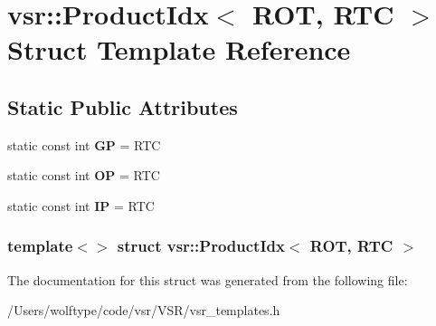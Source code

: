 \hypertarget{structvsr_1_1_product_idx_3_01_r_o_t_00_01_r_t_c_01_4}{\section{vsr\-:\-:Product\-Idx$<$ R\-O\-T, R\-T\-C $>$ Struct Template Reference}
\label{structvsr_1_1_product_idx_3_01_r_o_t_00_01_r_t_c_01_4}
}
\subsection*{Static Public Attributes}
\begin{DoxyCompactItemize}
\item 
\hypertarget{structvsr_1_1_product_idx_3_01_r_o_t_00_01_r_t_c_01_4_abd3369e5400a430e350dcb5d5043fdba}{static const int {\bfseries G\-P} = R\-T\-C}\label{structvsr_1_1_product_idx_3_01_r_o_t_00_01_r_t_c_01_4_abd3369e5400a430e350dcb5d5043fdba}

\item 
\hypertarget{structvsr_1_1_product_idx_3_01_r_o_t_00_01_r_t_c_01_4_a33f66cf87387e2b20ee1d34073abe720}{static const int {\bfseries O\-P} = R\-T\-C}\label{structvsr_1_1_product_idx_3_01_r_o_t_00_01_r_t_c_01_4_a33f66cf87387e2b20ee1d34073abe720}

\item 
\hypertarget{structvsr_1_1_product_idx_3_01_r_o_t_00_01_r_t_c_01_4_aaddfaacaa4574b01a809e8d407c66857}{static const int {\bfseries I\-P} = R\-T\-C}\label{structvsr_1_1_product_idx_3_01_r_o_t_00_01_r_t_c_01_4_aaddfaacaa4574b01a809e8d407c66857}

\end{DoxyCompactItemize}
\subsubsection*{template$<$$>$ struct vsr\-::\-Product\-Idx$<$ R\-O\-T, R\-T\-C $>$}



The documentation for this struct was generated from the following file\-:\begin{DoxyCompactItemize}
\item 
/\-Users/wolftype/code/vsr/\-V\-S\-R/vsr\-\_\-templates.\-h\end{DoxyCompactItemize}

